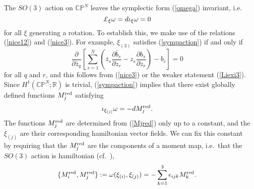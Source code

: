 \documentclass[a4paper,11pt]{article}
\begin{document}
The $SO(3)$ action on $\mathbb{CP}^{N}$ leaves the symplectic
form (\ref{omega}) invariant, i.e.
\begin{equation}\label{sympaction}
{\rm \pounds}_{\xi}\omega=d\iota_{\xi}\omega=0
\end{equation}
for all $\xi$ generating a rotation. To establish this, we make use
of the relations (\ref{nice12}) and (\ref{nice3}). For example,
$\xi_{(3)}$ satisfies (\ref{sympaction}) if and only if
\[
\frac{\partial}{\partial\bar{z}_{q}}\left[
\sum_{s=1}^{N}\left(\bar{z}_{s}\frac{\partial \bar{b}_{s}}{\partial
z_{r}} - {z}_{s}\frac{\partial {b}_{s}}{\partial z_{r}} \right)
-b_{r}\right]=0
\]
for all $q$ and $r$, and this follows from (\ref{nice3}) or the 
weaker statement (\ref{Liexi3}). Since 
$H^{1}(\mathbb{CP}^{N};\mathbb{R})$ is trivial, (\ref{sympaction}) 
implies that there exist globally defined functions $M_{j}^{\rm red}$ 
satisfying
\begin{equation} \label{Mjred}
\iota_{\xi_{(j)}}\omega=-dM^{\rm red}_{j}.
\end{equation}
The functions $M^{\rm red}_{j}$ are determined from (\ref{Mjred})
only up to a constant, and the $\xi_{(j)}$ are their corresponding
hamiltonian vector fields. We can fix this constant by requiring that
the $M^{\rm red}_{j}$ are the components of a moment map, i.e.~that the
$SO(3)$ action is hamiltonian (cf.~\cite{GS}),
\begin{equation} \label{hamaction}
\{M^{\rm red}_{i},M^{\rm red}_{j}\}:=\omega(\xi_{(i)},\xi_{(j)})=
-\sum_{k=1}^{3}\epsilon_{ijk}M^{\rm red}_{k}.
\end{equation}
\end{document}
